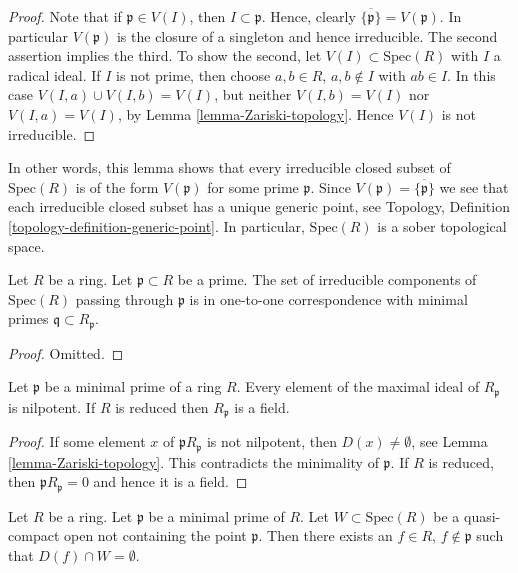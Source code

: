 \begin{proof}
Note that if $ \mathfrak p \in V(I)$, then
$I \subset \mathfrak p$. Hence,
clearly $\overline{\{\mathfrak p\}} = V(\mathfrak p)$.
In particular $V(\mathfrak p)$ is the closure of
a singleton and hence irreducible.
The second assertion implies the third.
To show the second, let
$V(I) \subset \text{Spec}(R)$ with $I$ a radical ideal.
If $I$ is not prime, then choose $a, b\in R$, $a, b\not \in I$
with $ab\in I$. In this case $V(I, a) \cup V(I, b) = V(I)$,
but neither $V(I, b) = V(I)$ nor $V(I, a) = V(I)$, by
Lemma \ref{lemma-Zariski-topology}. Hence $V(I)$ is not
irreducible.
\end{proof}

\noindent
In other words, this lemma shows that every irreducible closed
subset of $\text{Spec}(R)$ is of the form $V(\mathfrak p)$ for
some prime $\mathfrak p$. Since $V(\mathfrak p) = \overline{\{\mathfrak p\}}$
we see that each irreducible closed subset has a unique generic point,
see Topology, Definition \ref{topology-definition-generic-point}.
In particular, $\text{Spec}(R)$ is a sober topological space.

\begin{lemma}
\label{lemma-irreducible-components-containing-x}
Let $R$ be a ring.
Let $\mathfrak p \subset R$ be a prime.
The set of irreducible components of $\text{Spec}(R)$ passing through
$\mathfrak p$ is in one-to-one correspondence with minimal
primes $\mathfrak q \subset R_{\mathfrak p}$.
\end{lemma}

\begin{proof}
Omitted.
\end{proof}


\begin{lemma}
\label{lemma-minimal-prime-reduced-ring}
Let $\mathfrak p$ be a minimal prime of a ring $R$.
Every element of the maximal ideal of $R_{\mathfrak p}$
is nilpotent. If $R$ is reduced then $R_{\mathfrak p}$
is a field.
\end{lemma}

\begin{proof}
If some element $x$ of ${\mathfrak p}R_{\mathfrak p}$
is not nilpotent, then $D(x) \not = \emptyset$, see
Lemma \ref{lemma-Zariski-topology}. This contradicts
the minimality of $\mathfrak p$. If $R$ is reduced,
then ${\mathfrak p}R_{\mathfrak p} = 0$ and
hence it is a field.
\end{proof}

\begin{lemma}
\label{lemma-standard-open-containing-maximal-point}
Let $R$ be a ring.
Let $\mathfrak p$ be a minimal prime of $R$.
Let $W \subset \text{Spec}(R)$ be a quasi-compact open
not containing the point $\mathfrak p$. Then there
exists an $f \in R$, $f \not \in \mathfrak p$ such
that $D(f) \cap W = \emptyset$.
\end{lemma}

